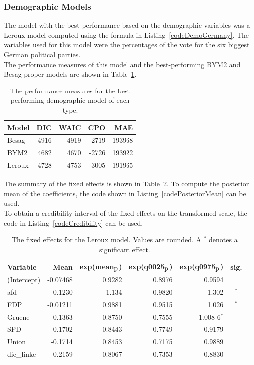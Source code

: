 \subsubsection{Demographic Models}\label{sssec:demoGermany}
The model with the best performance based on the demographic variables was a Leroux model computed using the formula in Listing~\ref{codeDemoGermany}. The variables used for this model were the percentages of the vote for the six biggest German political parties. \\
The performance measures of this model and the best-performing BYM2 and Besag proper models are shown in Table~\ref{demoGermany}. 
\begin{table}[H] 
\caption{The performance measures for the best performing demographic model of each type. \label{demoGermany}}
\begin{tabular}{l r r r r}
\toprule
\textbf{Model}	& \textbf{DIC}	& \textbf{WAIC} & \textbf{CPO} & \textbf{MAE}\\
\midrule
Besag  & 4916 & 4919 & -2719 &  193968 \\
BYM2 & 4682 & 4670 & -2726 &  193922\\
Leroux & 4728  & 4753 & -3005 & 191965\\
\bottomrule
\end{tabular}
\end{table}
The summary of the fixed effects is shown in Table~\ref{fixedDemoGermany}. To compute the posterior mean of the coefficients, the code shown in Listing~\ref{codePosteriorMean} can be used. \\
To obtain a credibility interval of the fixed effects on the transformed scale, the code in Listing~\ref{codeCredibility} can be used. \\
\begin{table}[H] 
\caption{The fixed effects for the Leroux model. Values are rounded. A $^*$ denotes a significant effect.\label{fixedDemoGermany}}
\begin{tabular}{l r r r r c}
\toprule
\textbf{Variable}	& \textbf{Mean}	& \textbf{exp(mean$_{\hbox{p}}$)} & \textbf{exp(q0025$_{\hbox{p}}$)} & \textbf{exp(q0975$_{\hbox{p}}$)} & \textbf{sig.}\\
\midrule
(Intercept) & -0.07468 & 0.9282 & 0.8976 & 0.9594 &\\
afd & 0.1230 & 1.134& 0.9820 & 1.302 &$^*$\\
FDP & -0.01211 & 0.9881& 0.9515 & 1.026 &$^*$\\
Gruene & -0.1363 & 0.8750& 0.7555 & 1.008 6$^*$\\
SPD & -0.1702 & 0.8443 & 0.7749 & 0.9179 &\\
Union & -0.1714 & 0.8453& 0.7175 & 0.9889 &\\
die\_linke & -0.2159 & 0.8067 & 0.7353 & 0.8830 &\\
\bottomrule
\end{tabular}
\end{table}
